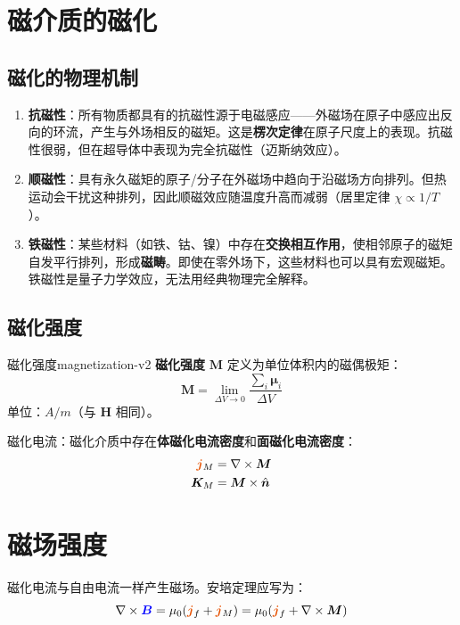\documentclass[11pt,a4paper,openany,oneside]{book}
\newcommand{\vecB}{\textcolor{blue}{\vect{B}}}
\newcommand{\vecJ}{\textcolor{cororange}{\vect{j}}}
\newcommand{\muz}{\mu_0}
\newcommand{\vect}[1]{\bm{#1}}
\newcommand{\unitvec}[1]{\hat{\vect{#1}}}
\newcommand{\curl}{\nabla\times}
\begin{document}
\section{磁介质的磁化}

\subsection{磁化的物理机制}

\begin{enumerate}
\item \textbf{抗磁性}：所有物质都具有的抗磁性源于电磁感应——外磁场在原子中感应出反向的环流，产生与外场相反的磁矩。这是\textbf{楞次定律}在原子尺度上的表现。抗磁性很弱，但在超导体中表现为完全抗磁性（迈斯纳效应）。

\item \textbf{顺磁性}：具有永久磁矩的原子/分子在外磁场中趋向于沿磁场方向排列。但热运动会干扰这种排列，因此顺磁效应随温度升高而减弱（居里定律 $\chi \propto 1/T$）。

\item \textbf{铁磁性}：某些材料（如铁、钴、镍）中存在\textbf{交换相互作用}，使相邻原子的磁矩自发平行排列，形成\textbf{磁畴}。即使在零外场下，这些材料也可以具有宏观磁矩。铁磁性是量子力学效应，无法用经典物理完全解释。
\end{enumerate}

\subsection{磁化强度}

\begin{definition}{磁化强度}{magnetization-v2}
\textbf{磁化强度} $\vect{M}$ 定义为单位体积内的磁偶极矩：
\[
\vect{M} = \lim_{\Delta V \to 0} \frac{\sum_i \vect{\mu}_i}{\Delta V}
\]
单位：$\si{A/m}$（与 $\vect{H}$ 相同）。
\end{definition}

磁化电流：磁化介质中存在\textbf{体磁化电流密度}和\textbf{面磁化电流密度}：
\begin{align}
\vecJ_M &= \curl\vect{M} \\
\vect{K}_M &= \vect{M} \times \unitvec{n}
\end{align}

\section{磁场强度}

磁化电流与自由电流一样产生磁场。安培定理应写为：
\[
\curl\vecB = \muz(\vecJ_f + \vecJ_M) = \muz(\vecJ_f + \curl\vect{M})
\]
\end{document}

